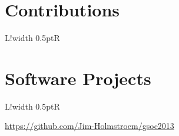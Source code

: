 \documentclass[10pt]{article}
\newcommand\VRule{\color{lightgray}\vrule width 0.5pt}
\begin{document}
\section*{Contributions}
\begin{tabular}{L!{\VRule}R}

\end{tabular}

\section*{Software Projects}
\begin{tabular}{L!{\VRule}R}

\end{tabular}

\scriptsize\hfill \url{https://github.com/Jim-Holmstroem/gsoc2013}\\
 
\end{document}
